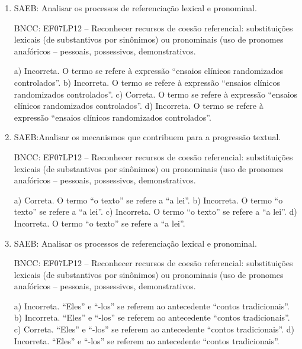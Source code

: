 
\begin{enumerate}

\item
SAEB: Analisar os processos de referenciação lexical e pronominal.

BNCC: EF07LP12 -- Reconhecer recursos de coesão referencial:
substituições lexicais (de substantivos por sinônimos) ou pronominais
(uso de pronomes anafóricos -- pessoais, possessivos, demonstrativos.

a) Incorreta. O termo se refere à expressão ``ensaios clínicos randomizados controlados''.
b) Incorreta. O termo se refere à expressão ``ensaios clínicos randomizados controlados''.
c) Correta. O termo se refere à expressão ``ensaios clínicos randomizados controlados''. 
d) Incorreta. O termo se refere à expressão ``ensaios clínicos randomizados controlados''.

\item
SAEB:Analisar os mecanismos que contribuem para a progressão textual.

BNCC: EF07LP12 -- Reconhecer recursos de coesão referencial:
substituições lexicais (de substantivos por sinônimos) ou pronominais
(uso de pronomes anafóricos -- pessoais, possessivos, demonstrativos.

a) Correta. O termo ``o texto'' se refere a ``a lei''.
b) Incorreta. O termo ``o texto'' se refere a ``a lei''.  
c) Incorreta. O termo ``o texto'' se refere a ``a lei''. 
d) Incorreta. O termo ``o texto'' se refere a ``a lei''.

\item
SAEB: Analisar os processos de referenciação lexical e pronominal.

BNCC: EF07LP12 -- Reconhecer recursos de coesão referencial:
substituições lexicais (de substantivos por sinônimos) ou pronominais
(uso de pronomes anafóricos -- pessoais, possessivos, demonstrativos.

a) Incorreta. ``Eles'' e ``-los'' se referem ao antecedente ``contos tradicionais''.
b) Incorreta. ``Eles'' e ``-los'' se referem ao antecedente ``contos tradicionais''.
c) Correta. ``Eles'' e ``-los'' se referem ao antecedente ``contos tradicionais''.
d) Incorreta. ``Eles'' e ``-los'' se referem ao antecedente ``contos tradicionais''.

\end{enumerate}


